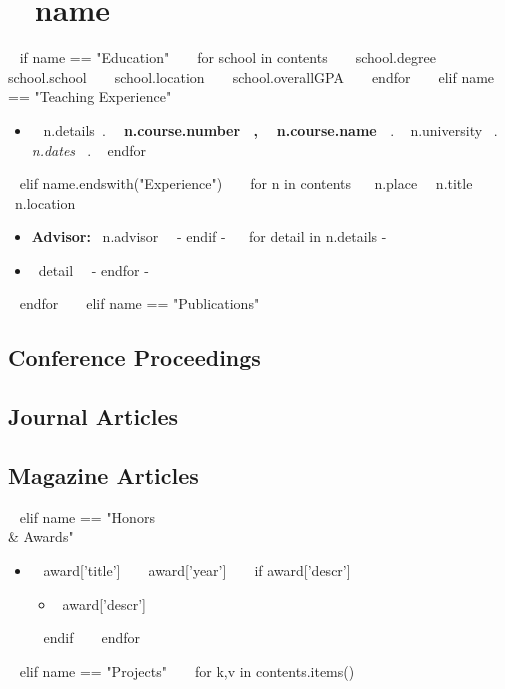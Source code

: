 \section{ ~{{ name }}~ }

~{ if name == "Education" }~
  ~{ for school in contents }~
      {~{{ school.degree }}~}%
      {~{{ school.school }}~}%
      {~{{ school.location }}~}%
      {~{{ school.overallGPA }}~}%
      {}
  ~{ endfor }~
~{ elif name == "Teaching Experience" }~
  \begin{itemize}
    ~{ for n in contents }~
      \item
        ~{{ n.details}}~.
        {\bf ~{{ n.course.number }}~, ~{{ n.course.name }}~}.
        ~{{ n.university }}~.
        {\it ~{{ n.dates }}~}.
    ~{ endfor }~
  \end{itemize}
~{ elif name.endswith("Experience") }~
  ~{ for n in contents }~
      {~{{n.place}}~}%
      {~{{n.title}}~}%
      {~{{n.location}}~}%
      {}%
      {
        \begin{itemize}
        ~{ if n.advisor -}~
          \item {\bf Advisor:} ~{{n.advisor}}~
        ~{- endif -}~
        ~{ for detail in n.details -}~
          \item ~{{detail}}~
        ~{- endfor -}~
        \end{itemize}
      }
  ~{ endfor }~
~{ elif name == "Publications" }~
  \nocite{*}

  \renewcommand*{\bibfont}{\small}
  \subsection{Conference Proceedings}
  \printbibliography[heading=none,type=inproceedings,prefixnumbers=C]

  \subsection{Journal Articles}
  \printbibliography[heading=none,type=article,keyword=journal,
    resetnumbers=true,prefixnumbers=J]

  \subsection{Magazine Articles}
  \printbibliography[heading=none,type=article,keyword=magazine,
    resetnumbers=true,prefixnumbers=M]

~{ elif name == "Honors \\& Awards" }~
  \begin{itemize}
  ~{ for award in contents }~
    \item ~{{ award['title'] }}~ \hfill ~{{ award['year'] }}~
    ~{ if award['descr'] }~
      \begin{itemize}
      \item {~{{award['descr']}}~}
      \end{itemize}
    ~{ endif }~
  ~{ endfor }~
  \end{itemize}
~{ elif name == "Projects" }~
  ~{ for k,v in contents.items() }~
